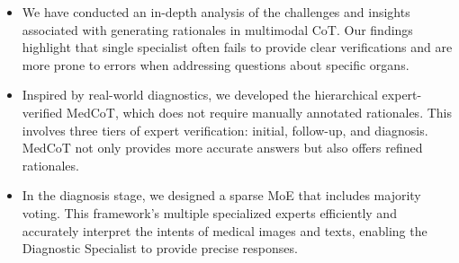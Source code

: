 \documentclass[11pt]{article}
\begin{document}
\begin{itemize}
    \item We have conducted an in-depth analysis of the challenges and insights associated with generating rationales in multimodal CoT. Our findings highlight that single specialist often fails to provide clear verifications and are more prone to errors when addressing questions about specific organs.
    \item Inspired by real-world diagnostics, we developed the hierarchical expert-verified MedCoT, which does not require manually annotated rationales. This involves three tiers of expert verification: initial, follow-up, and diagnosis. MedCoT not only provides more accurate answers but also offers refined rationales.
    \item In the diagnosis stage, we designed a sparse MoE that includes majority voting. This framework's multiple specialized experts efficiently and accurately interpret the intents of medical images and texts, enabling the Diagnostic Specialist to provide precise responses.
    
    
\end{itemize}

\vspace{1em}




\end{document}
